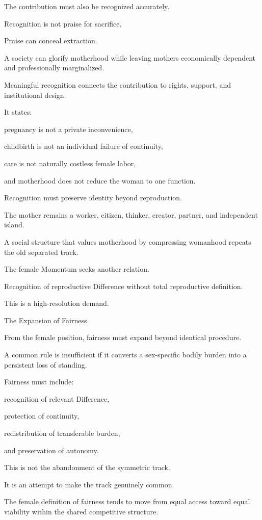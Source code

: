 The contribution must also be recognized accurately.

Recognition is not praise for sacrifice.

Praise can conceal extraction.

A society can glorify motherhood while leaving mothers economically dependent and professionally marginalized.

Meaningful recognition connects the contribution to rights, support, and institutional design.

It states:

pregnancy is not a private inconvenience,

childbirth is not an individual failure of continuity,

care is not naturally costless female labor,

and motherhood does not reduce the woman to one function.

Recognition must preserve identity beyond reproduction.

The mother remains a worker, citizen, thinker, creator, partner, and independent island.

A social structure that values motherhood by compressing womanhood repeats the old separated track.

The female Momentum seeks another relation.

Recognition of reproductive Difference without total reproductive definition.

This is a high-resolution demand.

The Expansion of Fairness

From the female position, fairness must expand beyond identical procedure.

A common rule is insufficient if it converts a sex-specific bodily burden into a persistent loss of standing.

Fairness must include:

recognition of relevant Difference,

protection of continuity,

redistribution of transferable burden,

and preservation of autonomy.

This is not the abandonment of the symmetric track.

It is an attempt to make the track genuinely common.

The female definition of fairness tends to move from equal access toward equal viability within the shared competitive structure.

